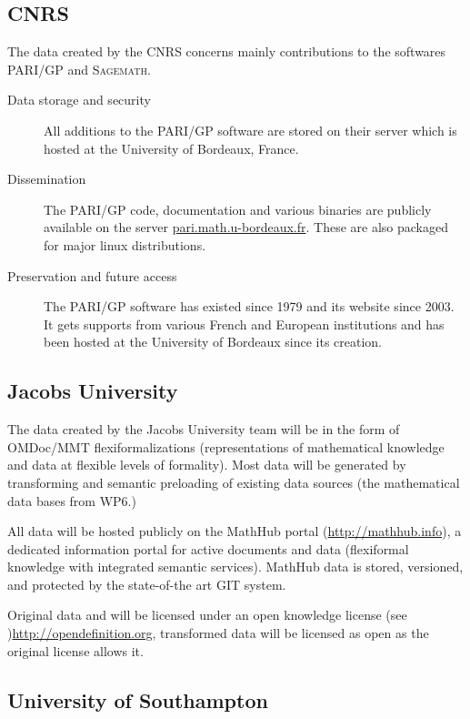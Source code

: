 \documentclass[12pt]{article}
\newcommand{\software}[1]{\textsc{#1}\xspace}
\newcommand{\Sage}{\software{Sagemath}}
\newcommand{\PARIGP}{\software{PARI/GP}}
\begin{document}
\subsection{CNRS}

The data created by the CNRS concerns mainly contributions to the softwares \PARIGP and \Sage.
\begin{description}
\item[Data storage and security] All additions to the \PARIGP software are stored on their server which is hosted at the University of Bordeaux, France.
\item[Dissemination] The \PARIGP code, documentation and various binaries are publicly available on the server \href{http://pari.math.u-bordeaux.fr/}{pari.math.u-bordeaux.fr}. These are also packaged for major linux distributions.
\item[Preservation and future access] The \PARIGP software has existed
  since 1979 and its website since 2003. It gets supports from various
  French and European institutions and has been hosted at the University of Bordeaux since its creation.
\end{description}


\subsection{Jacobs University}

The data created by the Jacobs University team will be in the form of OMDoc/MMT
flexiformalizations (representations of mathematical knowledge and data at flexible levels
of formality). Most data will be generated by transforming and semantic preloading of
existing data sources (the mathematical data bases from WP6.)

All data will be hosted publicly on the MathHub portal (\url{http://mathhub.info}), a
dedicated information portal for active documents and data (flexiformal knowledge with
integrated semantic services). MathHub data is stored, versioned, and protected by the
state-of-the art GIT system.

Original data and will be licensed under an open knowledge license (see
)\url{http://opendefinition.org}, transformed data will be licensed as open as the
original license allows it.

\subsection{University of Southampton}
\end{document}

